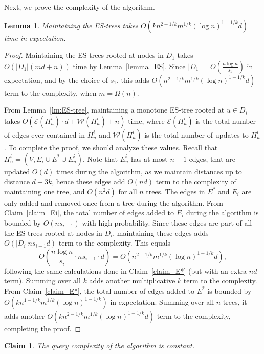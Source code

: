 \documentclass[11pt]{article}
\newtheorem{lemma}[theorem]{Lemma}
\newtheorem{claim}[theorem]{Claim}
\theoremstyle{definition}
\theoremstyle{remark}
\begin{document}
\begin{titlepage}
Next, we prove the complexity of the algorithm. 

\begin{lemma}\label{lemma_time_additive}
Maintaining the ES-trees takes $O(kn^{2-1/k}m^{1/k}(\log{n})^{1-1/k} d)$ time in expectation.
\end{lemma}

\begin{proof}
Maintaining the ES-trees rooted at nodes in $D_1$ takes $O(|D_1|(md+n))$ time by Lemma~\ref{lemma_ES}. 
Since $|D_1| = O(\frac{n\log{n}}{s_1})$ in expectation, and by the choice of $s_1$, this adds $O(n^{2-1/k}m^{1/k}(\log{n})^{1-1/k} d)$ term to the complexity, when $m=\Omega(n)$. 

From Lemma~\ref{lm:ES-tree}, maintaining a monotone ES-tree rooted at $u \in D_i$ takes $O(\mathcal E(H_u^i)\cdot d+\mathcal W(H_u^i)+n)$ time, where $\mathcal E(H_u^i)$ is the total number of edges ever contained in $H_u^i$ and $\mathcal W(H_u^i)$ is the total number of updates to $H_u^i$. To complete the proof, we should analyze these values. Recall that $H_u^i=(V, E_i \cup E^* \cup E_u^i)$. Note that $E_u^i$ has at most $n-1$ edges, that are updated $O(d)$ times during the algorithm, as we maintain distances up to distance $d+3k$, hence these edges add $O(nd)$ term to the complexity of maintaining one tree, and $O(n^2 d)$ for all $n$ trees. The edges in $E^*$ and $E_i$ are only added and removed once from a tree during the algorithm. From Claim~\ref{claim_Ei}, the total number of edges added to $E_i$ during the algorithm is bounded by $O(ns_{i-1})$ with high probability. Since these edges are part of all the ES-trees rooted at nodes in $D_i$, maintaining these edges adds $O(|D_i| n s_{i-1} d)$ term to the complexity.
This equals $$O \left( \frac{n \log{n}}{s_i} \cdot n s_{i-1} \cdot d \right) = O( n^{2-1/k}m^{1/k}(\log{n})^{1-1/k} d),$$ following the same calculations done in Claim~\ref{claim_E*} (but with an extra $nd$ term). Summing over all $k$ adds another multiplicative $k$ term to the complexity.
From Claim~\ref{claim_E*}, the total number of edges added to $E^*$ is bounded by $O(kn^{1-1/k}m^{1/k}(\log{n})^{1-1/k})$ in expectation. Summing over all $n$ trees, it adds another $O( kn^{2-1/k}m^{1/k}(\log{n})^{1-1/k} d)$ term to the complexity, completing the proof.
\end{proof}

\begin{claim}
The query complexity of the algorithm is constant.
\end{claim}


\end{titlepage}
\end{document}
